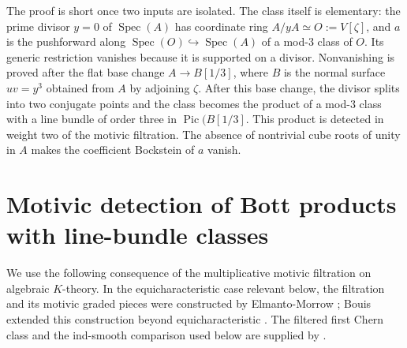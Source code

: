 \documentclass[10pt]{amsart}
\DeclareMathOperator{\Pic}{Pic}
\DeclareMathOperator{\Spec}{Spec}
\theoremstyle{remark}
\begin{document}
The proof is short once two inputs are isolated.  The class itself is
elementary: the prime divisor $y=0$ of $\Spec(A)$ has coordinate ring
$A/yA\simeq O:=V[\zeta]$, and $a$ is the pushforward along
$\Spec(O)\hookrightarrow\Spec(A)$ of a mod-$3$ class of $O$.  
Its generic restriction vanishes because it is supported on a divisor.
Nonvanishing is proved after the flat base change
$A\to B[1/3]$, where $B$ is the normal surface $uv=y^3$ obtained from $A$ by
adjoining $\zeta$. After this base change, the divisor splits into two conjugate points and the class
becomes the product of a mod-$3$ class with a line bundle of order three in
$\Pic(B[1/3]$. This product is detected in weight two of the motivic filtration.
The absence of nontrivial cube roots of unity in $A$ makes the coefficient
Bockstein of $a$ vanish.


\section{Motivic detection of Bott products with line-bundle classes}
\label{sec:motivic-detection}


We use the following consequence of the multiplicative motivic filtration
on algebraic \(K\)-theory.  In the equicharacteristic case relevant below,
the filtration and its motivic graded pieces were constructed by
Elmanto-Morrow
\cite[Thm.~1.1]{ElmantoMorrowEquicharMotivic};
Bouis extended this construction beyond equicharacteristic
\cite[Thm.~C]{BouisMixedCharacteristicMotivicCohomology}.
The filtered first Chern class and the ind-smooth comparison used below
are supplied by
\cite{BouisWeibelVanishingPBF,BouisKunduBL}.
\end{document}
